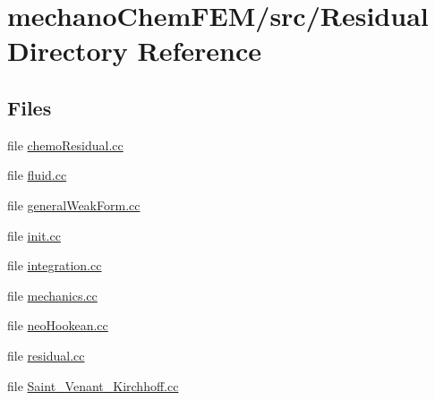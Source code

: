 \section{mechano\-Chem\-F\-E\-M/src/\-Residual Directory Reference}
\label{dir_80fe6afb1de6555e90cf2af09e5d7764}
\subsection*{Files}
\begin{DoxyCompactItemize}
\item 
file \hyperlink{chemo_residual_8cc}{chemo\-Residual.\-cc}
\item 
file \hyperlink{fluid_8cc}{fluid.\-cc}
\item 
file \hyperlink{general_weak_form_8cc}{general\-Weak\-Form.\-cc}
\item 
file \hyperlink{init_8cc}{init.\-cc}
\item 
file \hyperlink{integration_8cc}{integration.\-cc}
\item 
file \hyperlink{mechanics_8cc}{mechanics.\-cc}
\item 
file \hyperlink{neo_hookean_8cc}{neo\-Hookean.\-cc}
\item 
file \hyperlink{residual_8cc}{residual.\-cc}
\item 
file \hyperlink{_saint___venant___kirchhoff_8cc}{Saint\-\_\-\-Venant\-\_\-\-Kirchhoff.\-cc}
\end{DoxyCompactItemize}
